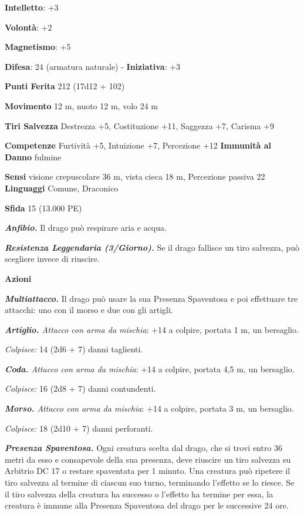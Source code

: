 \begin{multicols}{2}
\textbf{Intelletto}: +3

\textbf{Volontà}: +2

\textbf{Magnetismo}: +5

\textbf{Difesa}: 24 (armatura naturale) - \textbf{Iniziativa}: +3

\textbf{Punti Ferita} 212 (17d12 + 102)

\textbf{Movimento} 12 m, nuoto 12 m, volo 24 m

\textbf{Tiri Salvezza} Destrezza +5, Costituzione +11, Saggezza +7,
Carisma +9

\textbf{Competenze} Furtività +5, Intuizione +7, Percezione +12
\textbf{Immunità al Danno} fulmine

\textbf{Sensi} visione crepuscolare 36 m, vista cieca 18 m, Percezione passiva
22 \textbf{Linguaggi} Comune, Draconico

\textbf{Sfida} 15 (13.000 PE)\smallskip

\emph{\textbf{Anfibio.}} Il drago può respirare aria e acqua.

\emph{\textbf{Resistenza Leggendaria (3/Giorno).}} Se il drago fallisce
un tiro salvezza, può scegliere invece di riuscire.

\smallskip\textbf{Azioni}

\emph{\textbf{Multiattacco.}} Il drago può usare la sua Presenza
Spaventosa e poi effettuare tre attacchi: uno con il morso e due con gli
artigli.

\emph{\textbf{Artiglio.} Attacco con arma da mischia}: +14 a colpire,
portata 1 m, un bersaglio.

\emph{Colpisce:} 14 (2d6 + 7) danni taglienti.

\emph{\textbf{Coda.} Attacco con arma da mischia}: +14 a colpire,
portata 4,5 m, un bersaglio.

\emph{Colpisce:} 16 (2d8 + 7) danni contundenti.

\emph{\textbf{Morso.} Attacco con arma da mischia}: +14 a colpire,
portata 3 m, un bersaglio.

\emph{Colpisce:} 18 (2d10 + 7) danni perforanti.

\emph{\textbf{Presenza Spaventosa.}} Ogni creatura scelta dal drago, che
si trovi entro 36 metri da esso e consapevole della sua presenza, deve
riuscire un tiro salvezza su Arbitrio DC 17 o restare spaventata per 1
minuto. Una creatura può ripetere il tiro salvezza al termine di ciascun
suo turno, terminando l'effetto se lo riesce. Se il tiro salvezza della
creatura ha successo o l'effetto ha termine per essa, la creatura è
immune alla Presenza Spaventosa del drago per le successive 24 ore.


\end{multicols}
